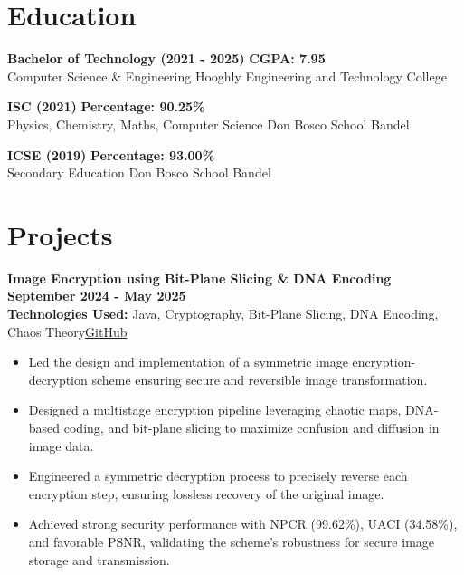\documentclass[a4paper,10pt]{article}
\begin{document}
\section*{Education}
\textbf{Bachelor of Technology (2021 - 2025)} \hfill {\textbf{CGPA: 7.95}} \\
Computer Science \& Engineering \hfill Hooghly Engineering and Technology College %

\vspace{0.5em}

\textbf{ISC (2021)} \hfill {\textbf{Percentage: 90.25\%}} \\
Physics, Chemistry, Maths, Computer Science \hfill Don Bosco School Bandel

\vspace{0.5em}

\textbf{ICSE (2019)} \hfill {\textbf{Percentage: 93.00\%}} \\
Secondary Education \hfill Don Bosco School Bandel






\section*{Projects}
\textbf{Image Encryption using Bit-Plane Slicing \& DNA Encoding} \hfill {\textbf{September 2024 - May 2025}}\\[0.5em]
\textbf{Technologies Used:} Java, Cryptography, Bit-Plane Slicing, DNA Encoding, Chaos Theory\hfill {\href{https://github.com/subhrasmit17/Image-Encryption-Offline}{GitHub}}

\begin{itemize}[leftmargin=*]
    \item Led the design and implementation of a symmetric image encryption-decryption scheme ensuring secure and reversible image transformation.
    \item Designed a multistage encryption pipeline leveraging chaotic maps, DNA-based coding, and bit-plane slicing to maximize confusion and diffusion in image data.
    \item Engineered a symmetric decryption process to precisely reverse each encryption step, ensuring lossless recovery of the original image.
    \item Achieved strong security performance with NPCR (99.62\%), UACI (34.58\%), and favorable PSNR, validating the scheme's robustness for secure image storage and transmission.
\end{itemize}
\end{document}
